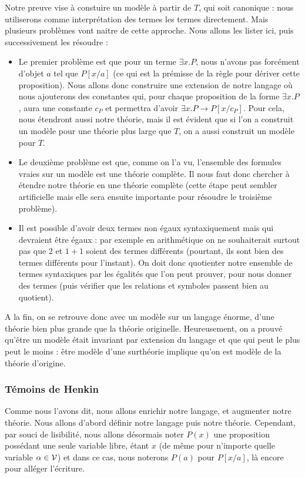 Notre preuve vise à constuire un modèle à partir de $T$, qui soit \og canonique\fg{} : nous utiliserons comme interprétation des termes les termes directement. Mais plusieurs problèmes vont naitre de cette approche. Nous allons les lister ici, puis successivement les résoudre :
\begin{itemize}[label=$\bullet$]
    \item Le premier problème est que pour un terme $\exists x.P$, nous n'avons pas forcément d'objet $a$ tel que $P[x/a]$ (ce qui est la prémisse de la règle pour dériver cette proposition). Nous allons donc construire une extension de notre langage où nous ajouterons des constantes qui, pour chaque proposition de la forme $\exists x.P$, aura une constante $c_P$ et permettra d'avoir $\exists x.P \to P[x/c_P]$. Pour cela, nous étendront aussi notre théorie, mais il est évident que si l'on a construit un modèle pour une théorie plus large que $T$, on a aussi construit un modèle pour $T$.
    \item Le deuxième problème est que, comme on l'a vu, l'ensemble des formules vraies sur un modèle est une théorie complète. Il nous faut donc chercher à étendre notre théorie en une théorie complète (cette étape peut sembler artificielle mais elle sera ensuite importante pour résoudre le troisième problème).
    \item Il est possible d'avoir deux termes non égaux syntaxiquement mais qui devraient être égaux : par exemple en arithmétique on ne souhaiterait surtout pas que $2$ et $1+1$ soient des termes différents (pourtant, ils sont bien des termes différents pour l'instant). On doit donc quotienter notre ensemble de termes syntaxiques par les égalités que l'on peut prouver, pour nous donner des termes (puis vérifier que les relations et symboles passent bien au quotient).
\end{itemize}

A la fin, on se retrouve donc avec un modèle sur un langage énorme, d'une théorie bien plus grande que la théorie originelle. Heureusement, on a prouvé qu'être un modèle était invariant par extension du langage et que \og qui peut le plus peut le moins \fg{} : être modèle d'une surthéorie implique qu'on est modèle de la théorie d'origine.

\subsubsection{Témoins de Henkin}

Comme nous l'avons dit, nous allons enrichir notre langage, et augmenter notre théorie. Nous allons d'abord définir notre langage puis notre théorie. Cependant, par souci de lisibilité, nous allons désormais noter $P(x)$ une proposition possédant une seule variable libre, étant $x$ (de même pour n'importe quelle variable $\alpha\in\mathcal V$) et dans ce cas, nous noterons $P(a)$ pour $P[x/a]$, là encore pour alléger l'écriture.


